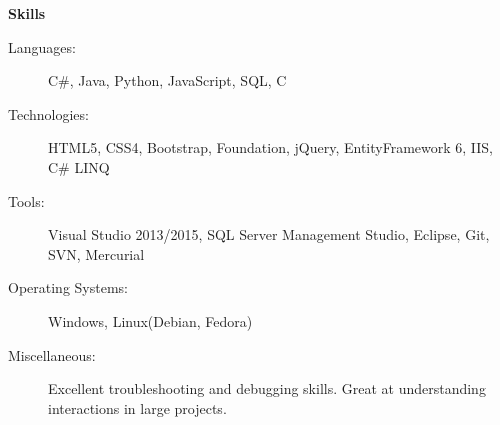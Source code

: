 \documentclass[letterpaper,11pt]{article}
\newcommand{\resheading}[1]{{\large \colorbox{mygrey}{\begin{minipage}{\textwidth}{\textbf{#1 \vphantom{p\^{E}}}}\end{minipage}}}}
\begin{document}
\resheading{Skills}
\begin{description}
\item[Languages:]
C\#, Java, Python, JavaScript, SQL, C
\item[Technologies:]
HTML5, CSS4, Bootstrap, Foundation, jQuery, EntityFramework 6, IIS, C\# LINQ
\item[Tools:]
Visual Studio 2013/2015, SQL Server Management Studio, Eclipse, Git, SVN, Mercurial
\item[Operating Systems:]
Windows, Linux(Debian, Fedora)
\item[Miscellaneous:]
Excellent troubleshooting and debugging skills. Great at understanding interactions in large projects.
\end{description}
\end{document}
